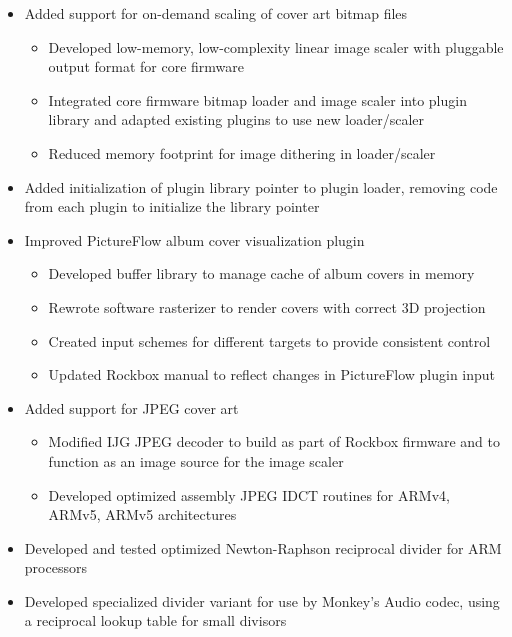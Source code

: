 \documentclass[11pt,a4paper,sans]{moderncv}
\begin{document}
\begin{itemize}
    \item Added support for on-demand scaling of cover art bitmap files
    \begin{itemize}
        \item Developed low-memory, low-complexity linear image scaler with pluggable output format for core firmware
        \item Integrated core firmware bitmap loader and image scaler into plugin library and adapted existing plugins to use new loader/scaler
        \item Reduced memory footprint for image dithering in loader/scaler
    \end{itemize}
    \item Added initialization of plugin library pointer to plugin loader, removing code from each plugin to initialize the library pointer
    \item Improved PictureFlow album cover visualization plugin
    \begin{itemize}
        \item Developed buffer library to manage cache of album covers in memory
        \item Rewrote software rasterizer to render covers with correct 3D projection
        \item Created input schemes for different targets to provide consistent control
        \item Updated Rockbox manual to reflect changes in PictureFlow plugin input
    \end{itemize}
    \item Added support for JPEG cover art
    \begin{itemize}
        \item Modified IJG JPEG decoder to build as part of Rockbox firmware and to function as an image source for the image scaler
        \item Developed optimized assembly JPEG IDCT routines for ARMv4, ARMv5, ARMv5 architectures
    \end{itemize}
    \item Developed and tested optimized Newton-Raphson reciprocal divider for ARM processors
    \item Developed specialized divider variant for use by Monkey's Audio codec, using a reciprocal lookup table for small divisors
\end{itemize}
\end{document}
